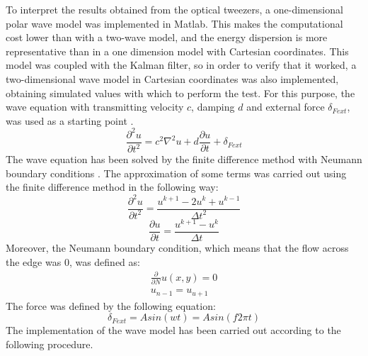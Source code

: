 \documentclass[12pt, a4paper]{article} %
\begin{document}
To interpret the results obtained from the optical tweezers, a one-dimensional polar wave model was implemented in Matlab. This makes the computational cost lower than with a two-wave model, and the energy dispersion is more representative than in a one dimension model with Cartesian coordinates. This model was coupled with the Kalman filter, so in order to verify that it worked, a two-dimensional wave model in Cartesian coordinates was also implemented, obtaining simulated values with which to perform the test. For this purpose, the wave equation with transmitting velocity $c$, damping $d$ and external force $\delta_{Fext}$, was used as a starting point \cite{achenbach2012wave, d'alembert_1749}.
\setlength{\parskip}{4mm}
\begin{equation} \label{eqn:wave_model}
   \frac{\partial^{2}u}{\partial t^{2}} = c^{2}\nabla^{2}u + d\frac{\partial u}{\partial t} + \delta_{Fext}
\end{equation}
The wave equation has been solved by the finite difference method \cite{petter2017finite} with Neumann boundary conditions \cite{mathews2000metodos}. The approximation of some terms was carried out using the finite difference method in the following way:
\begin{equation} \label{eqn:deltau_deltat2}
   \frac{\partial^{2}u}{\partial t^{2}} = \frac{u^{k + 1} - 2u^{k} + u^{k - 1}}{\Delta t^{2}} 
\end{equation}
\begin{equation} \label{eqn:deltau_deltat}
   \frac{\partial u}{\partial t} = \frac{u^{k + 1} - u^{k}}{\Delta t}
\end{equation}
Moreover, the Neumann boundary condition, which means that the flow across the edge was 0, was defined as:
\begin{equation} \label{eqn:neumann}
	\begin{array}{ l }
 \frac{\partial}{\partial N} u(x, y) = 0\\
 u_{n-1} = u_{u+1}
	\end{array}
\end{equation}
The force was defined by the following equation:
\begin{equation} \label{eqn:force}
    \delta_{Fext} = Asin(wt) = Asin(f2\pi t)
\end{equation}
The implementation of the wave model has been carried out according to the following procedure.

\setlength{\parindent}{0pt}

\setlength{\parskip}{8mm}
\end{document}
